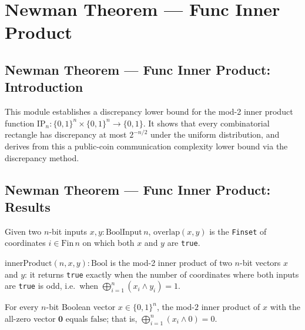 \section{Newman Theorem --- Func Inner Product}
\subsection*{Newman Theorem --- Func Inner Product: Introduction}

This module establishes a discrepancy lower bound for the mod-2 inner product function
$\mathrm{IP}_n : \{0,1\}^n \times \{0,1\}^n \to \{0,1\}$.  It shows that every
combinatorial rectangle has discrepancy at most $2^{-n/2}$ under the uniform
distribution, and derives from this a public-coin communication complexity lower bound
via the discrepancy method.

\subsection*{Newman Theorem --- Func Inner Product: Results}

\begin{definition}
\label{CommunicationComplexity.Functions.InnerProduct.overlap}
\leanok
{}
Given two $n$-bit inputs $x, y : \mathrm{BoolInput}\,n$, $\mathrm{overlap}(x, y)$ is
the \texttt{Finset} of coordinates $i \in \mathrm{Fin}\,n$ on which both $x$ and $y$
are \texttt{true}.
\end{definition}

\begin{definition}
\label{CommunicationComplexity.Functions.InnerProduct.innerProduct}
\leanok
{}
$\mathrm{innerProduct}(n, x, y) : \mathrm{Bool}$ is the mod-2 inner product of two
$n$-bit vectors $x$ and $y$: it returns \texttt{true} exactly when the number of
coordinates where both inputs are \texttt{true} is odd, i.e.\ when
$\bigoplus_{i=1}^{n} (x_i \wedge y_i) = 1$.
\end{definition}

\begin{lemma}
\label{CommunicationComplexity.Functions.InnerProduct.innerProduct_zero_right}
\leanok
{}
For every $n$-bit Boolean vector $x \in \{0,1\}^n$, the mod-$2$ inner product of $x$
with the all-zero vector $\mathbf{0}$ equals $\mathrm{false}$; that is,
$\bigoplus_{i=1}^{n} (x_i \wedge 0) = 0$.
\end{lemma}

